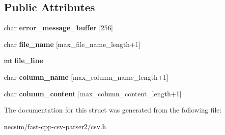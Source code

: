 \subsection*{Public Attributes}
\begin{DoxyCompactItemize}
\item 
char {\bfseries error\+\_\+message\+\_\+buffer} \mbox{[}256\mbox{]}\hypertarget{structio_1_1error_1_1base_a8e38f86a7afea1f0c6e6cac0c548d6f2}{}\label{structio_1_1error_1_1base_a8e38f86a7afea1f0c6e6cac0c548d6f2}

\item 
char {\bfseries file\+\_\+name} \mbox{[}max\+\_\+file\+\_\+name\+\_\+length+1\mbox{]}\hypertarget{structio_1_1error_1_1with__file__name_ac957d5590a8b95517b74eb5bf373a424}{}\label{structio_1_1error_1_1with__file__name_ac957d5590a8b95517b74eb5bf373a424}

\item 
int {\bfseries file\+\_\+line}\hypertarget{structio_1_1error_1_1with__file__line_a391298c37172bcdb83aeb3daf65d5a0e}{}\label{structio_1_1error_1_1with__file__line_a391298c37172bcdb83aeb3daf65d5a0e}

\item 
char {\bfseries column\+\_\+name} \mbox{[}max\+\_\+column\+\_\+name\+\_\+length+1\mbox{]}\hypertarget{structio_1_1error_1_1with__column__name_af40ba00f1f035d363b099baf1f724323}{}\label{structio_1_1error_1_1with__column__name_af40ba00f1f035d363b099baf1f724323}

\item 
char {\bfseries column\+\_\+content} \mbox{[}max\+\_\+column\+\_\+content\+\_\+length+1\mbox{]}\hypertarget{structio_1_1error_1_1with__column__content_a8587779769fbfb40155abb362137a523}{}\label{structio_1_1error_1_1with__column__content_a8587779769fbfb40155abb362137a523}

\end{DoxyCompactItemize}


The documentation for this struct was generated from the following file\+:\begin{DoxyCompactItemize}
\item 
necsim/fast-\/cpp-\/csv-\/parser2/csv.\+h\end{DoxyCompactItemize}
